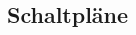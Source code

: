 %
%

\begin{spacing}{1}                              %
\appendix
\renewcommand*{\chapterpagestyle}{scrheadings}  %

    \chapter{Schaltpläne}                       %




    \listoffigures                              %
    \listoftables                               %
    \lstlistoflistings							%

    \printbibliography

\appendix
\end{spacing} 